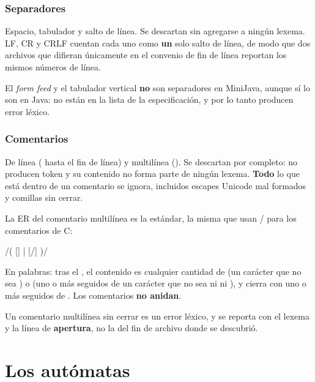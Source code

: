 \documentclass[11pt,a4paper]{article}
\begin{document}
\subsubsection{Separadores}

Espacio, tabulador y salto de línea. Se descartan sin agregarse a ningún lexema. LF, CR y CRLF
cuentan cada uno como \textbf{un} solo salto de línea, de modo que dos archivos que difieran
únicamente en el convenio de fin de línea reportan los mismos números de línea.

El \emph{form feed} y el tabulador vertical \textbf{no} son separadores en MiniJava, aunque sí lo son
en Java: no están en la lista de la especificación, y por lo tanto producen error léxico.

\subsubsection{Comentarios}

De línea (\lex{// \ldots} hasta el fin de línea) y multilínea (\lex{/* \ldots */}). Se descartan por
completo: no producen token y su contenido no forma parte de ningún lexema. \textbf{Todo} lo que está
dentro de un comentario se ignora, incluidos escapes Unicode mal formados y comillas sin cerrar.

La ER del comentario multilínea es la estándar, la misma que usan / para los
comentarios de C:

\begin{er}
/\bs*\quad( [\caret*] | \bs*\sups{+} [\caret*/] )\sups{*}\quad\bs*\sups{+}\quad/
\end{er}

En palabras: tras el \lex{/*}, el contenido es cualquier cantidad de (un carácter que no sea
\lex{*}) o (uno o más \lex{*} seguidos de un carácter que no sea ni \lex{*} ni \lex{/}), y cierra con
uno o más \lex{*} seguidos de \lex{/}. Los comentarios \textbf{no anidan}.

Un comentario multilínea sin cerrar es un error léxico, y se reporta con el lexema \lex{/*} y la
línea de \textbf{apertura}, no la del fin de archivo donde se descubrió.

\section{Los autómatas}
\end{document}
